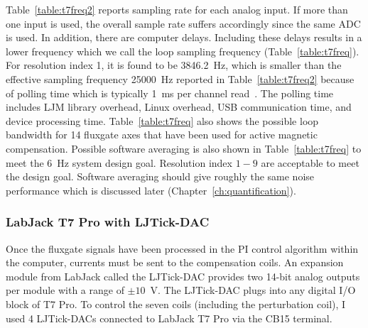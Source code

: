 
Table~\ref{table:t7freq2} reports sampling rate for each analog input. If more than one input is used, the overall sample rate suffers accordingly since the same ADC is used. In addition, there are computer delays. Including these delays results in a lower frequency which we call the loop sampling frequency (Table~\ref{table:t7freq}). For resolution index 1, it is found to be 3846.2~Hz, which is smaller than the effective sampling frequency 25000~Hz reported in Table~\ref{table:t7freq2} because of polling time which is typically 1~ms per channel read~\cite{T7}. The polling time includes LJM library overhead, Linux overhead, USB communication time, and device processing time. Table~\ref{table:t7freq} also shows the possible loop bandwidth for 14 fluxgate axes that have been used for active magnetic compensation. Possible software averaging is also shown in Table~\ref{table:t7freq} to meet the 6~Hz system design goal. Resolution index $1-9$ are acceptable to meet the design goal. Software averaging should give roughly the same noise performance which is discussed later (Chapter~\ref{ch:quantification}).

\subsubsection{LabJack T7 Pro with LJTick-DAC}
Once the fluxgate signals have been processed in the PI control algorithm within the computer, currents must be sent to the compensation coils. An expansion module from LabJack called the LJTick-DAC provides two 14-bit analog outputs per module with a range of $\pm10$~V. The LJTick-DAC plugs into any digital I/O block of T7 Pro. To control the seven coils (including the perturbation coil), I used 4 LJTick-DACs connected to LabJack T7 Pro via the CB15 terminal. 

